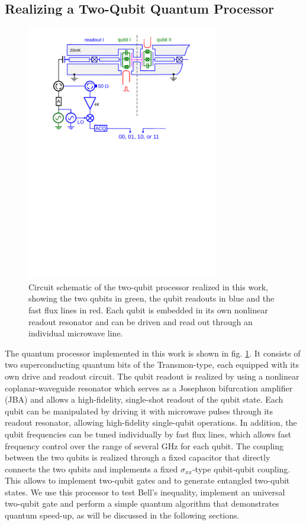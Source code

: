 \subsection{Realizing a Two-Qubit Quantum Processor}

\begin{figure}[ht!]
	\centering
		\includegraphics[width=0.75\textwidth]{./material/papers/grover/figures/2_qubit_processor_schematic}
	\caption[Circuit schematic of the realized two-qubit processor]{Circuit schematic of the two-qubit processor realized in this work, showing the two qubits in green, the qubit readouts in blue and the fast flux lines in red. Each qubit is embedded in its own nonlinear readout resonator and can be driven and read out through an individual microwave line.}
	\label{fig:two_qubit_processor_schematic}
\end{figure}

The quantum processor implemented in this work is shown in fig. \ref{fig:two_qubit_processor_schematic}. It consists of two superconducting quantum bits of the Transmon-type, each equipped with its own drive and readout circuit. The qubit readout is realized by using a nonlinear coplanar-waveguide resonator which serves as a Josephson bifurcation amplifier (JBA) and allows a high-fidelity, single-shot readout of the qubit state. Each qubit can be manipulated by driving it with microwave pulses through its readout resonator, allowing high-fidelity single-qubit operations. In addition, the qubit frequencies can be tuned individually by fast flux lines, which allows fast frequency control over the range of several GHz for each qubit. The coupling between the two qubits is realized through a fixed capacitor that directly connects the two qubits and implements a fixed $\sigma_{xx}$-type qubit-qubit coupling. This allows to implement two-qubit gates and to generate entangled two-qubit states. We use this processor to test Bell's inequality, implement an universal two-qubit gate and perform a simple quantum algorithm that demonstrates quantum speed-up, as will be discussed in the following sections.

